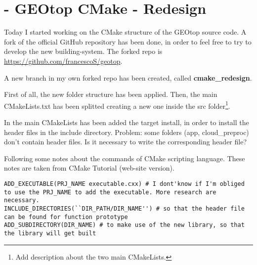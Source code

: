 \section{ - GEOtop CMake -
  Redesign}\label{sec:20150709}

Today I started working on the CMake structure of the GEOtop source
code. A fork of the official GitHub repository has been done, in order
to feel free to try to develop the new building-system. The forked
repo is \url{https://github.com/francescoS/geotop}.

A new branch in my own forked repo has been created, called
\textbf{cmake\_redesign}.

First of all, the new folder structure has been applied. Then, the
main CMakeLists.txt has been splitted creating a new one inside the
src folder\footnote{Add description about the two main CMakeLists.}.

In the main CMakeLists has been added the target install, in order to
install the header files in the include directory. Problem: some
folders (app, cloud\_preproc) don't contain header files. Is it
necessary to write the corresponding header file?

Following some notes about the commands of CMake scripting
language. These notes are taken from CMake Tutorial (web-site
version).

\begin{fullwidth}
  \begin{lstlisting}[style=cmakeStyle]
ADD_EXECUTABLE(PRJ_NAME executable.cxx) # I dont'know if I'm obliged to use the PRJ_NAME to add the executable. More research are necessary.
INCLUDE_DIRECTORIES(``DIR_PATH/DIR_NAME'') # so that the header file can be found for function prototype
ADD_SUBDIRECTORY(DIR_NAME) # to make use of the new library, so that the library will get built
  \end{lstlisting}
\end{fullwidth}
